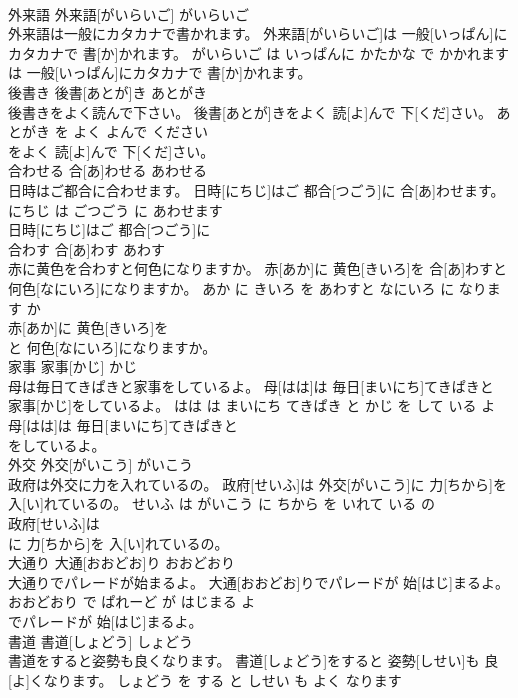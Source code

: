 \documentclass[8pt]{extreport}
\begin{document}
\begin{CJK}{UTF8}{min}
\\	外来語	外来語[がいらいご]	がいらいご	
\\	外来語は一般にカタカナで書かれます。	外来語[がいらいご]は 一般[いっぱん]にカタカナで 書[か]かれます。	がいらいご は いっぱんに かたかな で かかれます	
\\	は 一般[いっぱん]にカタカナで 書[か]かれます。			
\\	後書き	後書[あとが]き	あとがき	
\\	後書きをよく読んで下さい。	後書[あとが]きをよく 読[よ]んで 下[くだ]さい。	あとがき を よく よんで ください	
\\	をよく 読[よ]んで 下[くだ]さい。			
\\	合わせる	合[あ]わせる	あわせる	
\\	日時はご都合に合わせます。	日時[にちじ]はご 都合[つごう]に 合[あ]わせます。	にちじ は ごつごう に あわせます	
\\	日時[にちじ]はご 都合[つごう]に
\\	合わす	合[あ]わす	あわす	
\\	赤に黄色を合わすと何色になりますか。	赤[あか]に 黄色[きいろ]を 合[あ]わすと 何色[なにいろ]になりますか。	あか に きいろ を あわすと なにいろ に なります か	
\\	赤[あか]に 黄色[きいろ]を
\\	と 何色[なにいろ]になりますか。			
\\	家事	家事[かじ]	かじ	
\\	母は毎日てきぱきと家事をしているよ。	母[はは]は 毎日[まいにち]てきぱきと 家事[かじ]をしているよ。	はは は まいにち てきぱき と かじ を して いる よ	
\\	母[はは]は 毎日[まいにち]てきぱきと
\\	をしているよ。			
\\	外交	外交[がいこう]	がいこう	
\\	政府は外交に力を入れているの。	政府[せいふ]は 外交[がいこう]に 力[ちから]を 入[い]れているの。	せいふ は がいこう に ちから を いれて いる の	
\\	政府[せいふ]は
\\	に 力[ちから]を 入[い]れているの。			
\\	大通り	大通[おおどお]り	おおどおり	
\\	大通りでパレードが始まるよ。	大通[おおどお]りでパレードが 始[はじ]まるよ。	おおどおり で ぱれーど が はじまる よ	
\\	でパレードが 始[はじ]まるよ。			
\\	書道	書道[しょどう]	しょどう	
\\	書道をすると姿勢も良くなります。	書道[しょどう]をすると 姿勢[しせい]も 良[よ]くなります。	しょどう を する と しせい も よく なります	

\end{CJK}
\end{document}
